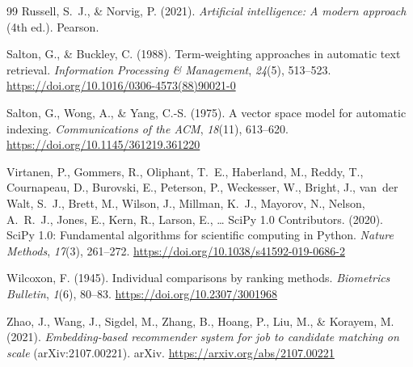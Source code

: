 \begin{thebibliography}{99}
Russell, S.~J., \& Norvig, P. (2021). \textit{Artificial intelligence: A modern approach} (4th ed.). Pearson.

Salton, G., \& Buckley, C. (1988). Term-weighting approaches in automatic text retrieval. \textit{Information Processing \& Management}, \textit{24}(5), 513--523. \url{https://doi.org/10.1016/0306-4573(88)90021-0}

Salton, G., Wong, A., \& Yang, C.-S. (1975). A vector space model for automatic indexing. \textit{Communications of the ACM}, \textit{18}(11), 613--620. \url{https://doi.org/10.1145/361219.361220}

Virtanen, P., Gommers, R., Oliphant, T.~E., Haberland, M., Reddy, T., Cournapeau, D., Burovski, E., Peterson, P., Weckesser, W., Bright, J., van~der Walt, S.~J., Brett, M., Wilson, J., Millman, K.~J., Mayorov, N., Nelson, A.~R.~J., Jones, E., Kern, R., Larson, E., \ldots{} SciPy 1.0 Contributors. (2020). SciPy 1.0: Fundamental algorithms for scientific computing in Python. \textit{Nature Methods}, \textit{17}(3), 261--272. \url{https://doi.org/10.1038/s41592-019-0686-2}

Wilcoxon, F. (1945). Individual comparisons by ranking methods. \textit{Biometrics Bulletin}, \textit{1}(6), 80--83. \url{https://doi.org/10.2307/3001968}

Zhao, J., Wang, J., Sigdel, M., Zhang, B., Hoang, P., Liu, M., \& Korayem, M. (2021). \textit{Embedding-based recommender system for job to candidate matching on scale} (arXiv:2107.00221). arXiv. \url{https://arxiv.org/abs/2107.00221}

\end{thebibliography}
